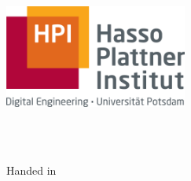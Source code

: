 \begin{titlepage}
    \begin{addmargin}[-1cm]{-3cm}
    \begin{center}
        \large  

        \hfill

        \vfill

        \begingroup
            \color{Maroon}\spacedallcaps{\myTitle} \\ \bigskip
        \endgroup

        \spacedlowsmallcaps{\myName}

        \vfill

        \includegraphics[width=6cm]{frontbackmatter/gfx/hpi_logo.jpg} \\ \medskip

        \myDepartment \\                            
        \myUni \\ \bigskip
        

        Handed in \myTime\ %

        \vfill                      

    \end{center}  
  \end{addmargin}       
\end{titlepage}   